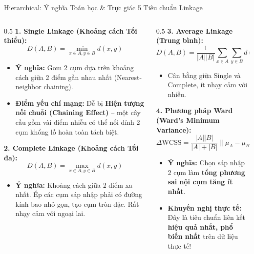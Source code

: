 \documentclass[aspectratio=169,10pt]{beamer}
\begin{document}
\begin{frame}{Hierarchical: Ý nghĩa Toán học \& Trực giác 5 Tiêu chuẩn Linkage}
  \footnotesize
  \begin{columns}[T]
    \begin{column}{0.5\textwidth}
      \textbf{1. Single Linkage (Khoảng cách Tối thiểu):}
      $$D(A, B) = \min_{x \in A, y \in B} d(x, y)$$
      \begin{itemize}\setlength{\itemsep}{1pt}
        \item \textbf{Ý nghĩa:} Gom 2 cụm dựa trên khoảng cách giữa 2 điểm gần nhau nhất (Nearest-neighbor chaining).
        \item \textbf{Điểm yếu chí mạng:} Dễ bị \textbf{Hiện tượng nối chuỗi (Chaining Effect)} -- một cây cầu gồm vài điểm nhiễu có thể nối dính 2 cụm khổng lồ hoàn toàn tách biệt.
      \end{itemize}
      \vspace{0.2em}
      \textbf{2. Complete Linkage (Khoảng cách Tối đa):}
      $$D(A, B) = \max_{x \in A, y \in B} d(x, y)$$
      \begin{itemize}\setlength{\itemsep}{1pt}
        \item \textbf{Ý nghĩa:} Khoảng cách giữa 2 điểm xa nhất. Ép các cụm sáp nhập phải có đường kính bao nhỏ gọn, tạo cụm tròn đặc. Rất nhạy cảm với ngoại lai.
      \end{itemize}
    \end{column}
    \begin{column}{0.5\textwidth}
      \textbf{3. Average Linkage (Trung bình):}
      $$D(A, B) = \frac{1}{|A||B|}\sum_{x \in A}\sum_{y \in B} d(x, y)$$
      \begin{itemize}\setlength{\itemsep}{1pt}
        \item Cân bằng giữa Single và Complete, ít nhạy cảm với nhiễu.
      \end{itemize}
      \vspace{0.2em}
      \textbf{4. Phương pháp Ward (Ward's Minimum Variance):}
      $$\Delta \text{WCSS} = \frac{|A||B|}{|A| + |B|}\|\mu_A - \mu_B\|_2^2$$
      \begin{itemize}\setlength{\itemsep}{1pt}
        \item \textbf{Ý nghĩa:} Chọn sáp nhập 2 cụm làm \textbf{tổng phương sai nội cụm tăng ít nhất}.
        \item \textbf{Khuyến nghị thực tế:} Đây là tiêu chuẩn liên kết \textbf{hiệu quả nhất, phổ biến nhất} trên dữ liệu thực tế!
      \end{itemize}
    \end{column}
  \end{columns}
\end{frame}
\end{document}
